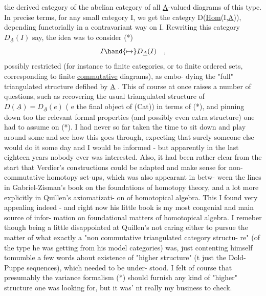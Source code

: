  the derived category of the abelian category of all \underline{A}-valued diagrams
of this type. In precise terms, for any small category I, we get
the categry D(\underline{Hom}(I,\underline{A})), depending functorially in a contravariant
way on I. Rewriting this category $D_{\underline{A}}(I)$ say, the idea was to consider
(*) \[ I \hand{\mapsto} D_{\underline{A}}(I) \quad , \]
possibly  restricted  (for instance to finite categories, or to finite
ordered sets, corresponding to finite \uline{commutative} diagrams), as embo-%
dying the "full" triangulated structure defihed by \underline{A} . This of course
at once raises a number of questions, such as recovering the usual
triangulated structure of $D(\underline{A}) = D_{\underline{A}}(e)$ ( e the final object of (Cat))
in terms of (*), and pinning down too the relevant formal properties
(and possibly even extra structure) one had to assume on (*). I had
never so far taken the time to sit down and play around some and see
how this goes through, expecting that surely someone else would do it
some day and I would be informed - but apparently in the last eighteen
years nobody ever was interested. Also, it had been rather clear from
the start that Verdier's constructions could be adapted and  make sense
for non-commutative homotopy set-ups, which was also appearant in betw-%
ween the lines in Gabriel-Zisman's  book on the foundations
of homotopy theory, and a lot more explicitly in Quillen's axiomatizati-%
on of homotopical algebra. This  I found very appealing indeed - and
right now  his little book is my most congenial and main source of infor-%
mation on foundational matters of homotopical algebra. I remeber though
 being a little disappointed at Quillen's not caring either to pursue the
matter of what exactly a "non commutative triangulated category structu-%
re" (of the type he was getting from his model categories) was, just
contenting himself tomumble a few words about existence of "higher
structure" (t just the Dold-Puppe sequences), which  needed to be under-%
stood. I felt of course that presumably the variance formalism (*) should
furnish any kind of "higher" structure one was looking for, but it was'
nt really my business to check.

